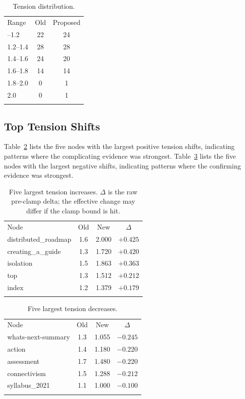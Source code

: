 \documentclass[10pt,twocolumn]{article}
\let\oldtoprule\toprule
\let\oldmidrule\midrule
\let\oldbottomrule\bottomrule
\renewcommand{\toprule}{\arrayrulecolor{deepblue}\oldtoprule}
\renewcommand{\midrule}{\arrayrulecolor{deepblue}\oldmidrule}
\renewcommand{\bottomrule}{\arrayrulecolor{deepblue}\oldbottomrule}
\begin{document}
\begin{table}[htbp]
\centering
\caption{Tension distribution.}
\label{tab:distribution}
\begin{tabular}{@{}lcc@{}}
\toprule
Range & Old & Proposed \\
\midrule
1.0--1.2 & 22 & 24 \\
1.2--1.4 & 28 & 28 \\
1.4--1.6 & 24 & 20 \\
1.6--1.8 & 14 & 14 \\
1.8--2.0 & 0 & 1 \\
2.0 & 0 & 1 \\
\bottomrule
\end{tabular}
\end{table}

\subsection{Top Tension Shifts}

Table~\ref{tab:top} lists the five nodes with the largest positive tension shifts, indicating patterns where the complicating evidence was strongest. Table~\ref{tab:bottom} lists the five nodes with the largest negative shifts, indicating patterns where the confirming evidence was strongest.

\begin{table}[htbp]
\centering
\caption{Five largest tension increases. $\Delta$ is the raw pre-clamp delta; the effective change may differ if the clamp bound is hit.}
\label{tab:top}
\begin{tabular}{@{}lccc@{}}
\toprule
Node & Old & New & $\Delta$ \\
\midrule
distributed\_roadmap & 1.6 & 2.000 & $+0.425$ \\
creating\_a\_guide & 1.3 & 1.720 & $+0.420$ \\
isolation & 1.5 & 1.863 & $+0.363$ \\
top & 1.3 & 1.512 & $+0.212$ \\
index & 1.2 & 1.379 & $+0.179$ \\
\bottomrule
\end{tabular}
\end{table}

\begin{table}[htbp]
\centering
\caption{Five largest tension decreases.}
\label{tab:bottom}
\begin{tabular}{@{}lccc@{}}
\toprule
Node & Old & New & $\Delta$ \\
\midrule
whats-next-summary & 1.3 & 1.055 & $-0.245$ \\
action & 1.4 & 1.180 & $-0.220$ \\
assessment & 1.7 & 1.480 & $-0.220$ \\
connectivism & 1.5 & 1.288 & $-0.212$ \\
syllabus\_2021 & 1.1 & 1.000 & $-0.100$ \\
\bottomrule
\end{tabular}
\end{table}
\end{document}
